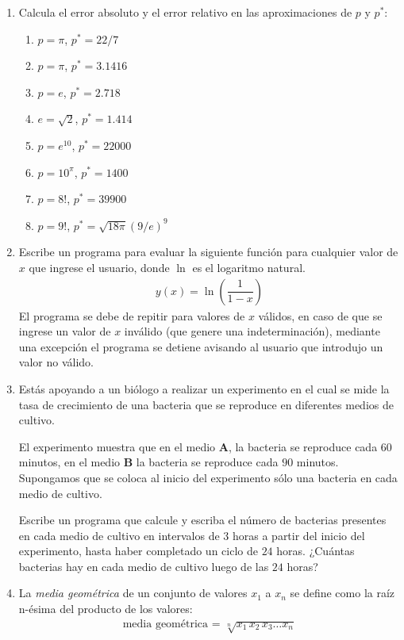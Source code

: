 \begin{enumerate}
\item Calcula el error absoluto y el error relativo en las aproximaciones de $p$ y $p^{*}$:
\begin{multicols}{2}
\begin{enumerate}
\item $p = \pi$, $p^{*} = 22/7$
\item $p = \pi$, $p^{*} = 3.1416$
\item $p = e$, $p^{*} = 2.718$
\item $e = \sqrt{2}$, $p^{*} = 1.414$
\item $p= e^{10}$, $p^{*} = 22000$
\item $p= 10^{\pi}$, $p^{*} = 1400$
\item $p = 8!$, $p^{*}=39900$
\item $p = 9!$, $p^{*}= \sqrt{18 \pi} (9/e)^{9}$
\end{enumerate}
\end{multicols}    
\item Escribe un programa para evaluar la siguiente función para cualquier valor de $x$ que ingrese el usuario, donde $\ln$ es el logaritmo natural.
\begin{align*}
y(x) = \ln \left( \dfrac{1}{1-x} \right)
\end{align*}
El programa se debe de repitir para valores de $x$ válidos, en caso de que se ingrese un valor de $x$ inválido (que genere una indeterminación), mediante una excepción el programa se detiene avisando al usuario que introdujo un valor no válido.
\item Estás apoyando a un biólogo a realizar un experimento en el cual se mide la tasa de crecimiento de una bacteria que se reproduce en diferentes medios de cultivo.
\par
El experimento muestra que en el medio \textbf{A}, la bacteria se reproduce cada $60$ minutos, en el medio \textbf{B} la bacteria se reproduce cada $90$ minutos. Supongamos que se coloca al inicio del experimento sólo una bacteria en cada medio de cultivo.
\par
Escribe un programa que calcule y escriba el número de bacterias presentes en cada medio de cultivo en intervalos de $3$ horas a partir del inicio del experimento, hasta haber completado un ciclo de $24$ horas. ¿Cuántas bacterias hay en cada medio de cultivo luego de las $24$ horas?
\item La \textit{media geométrica} de un conjunto de valores $x_{1}$ a $x_{n}$ se define como la raíz n-ésima del producto de los valores:
\begin{align*}
\text{media geométrica = } \sqrt[n]{x_{1} \, x_{2} \, x_{3} \ldots x_{n}}
\end{align*}


\end{enumerate}
